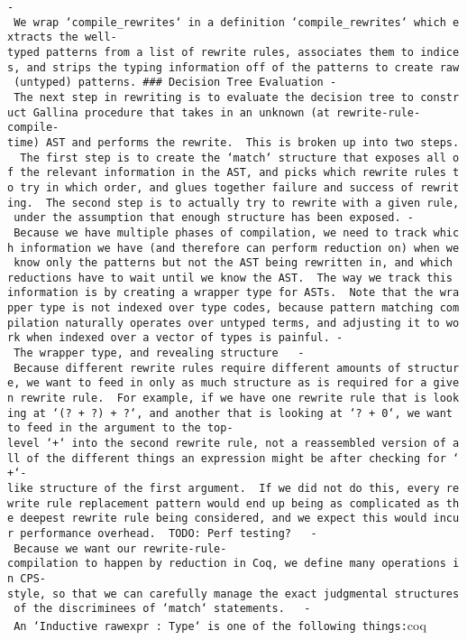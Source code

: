 \texttt{-\ We\ wrap\ `compile\_rewrites\textquotesingle{}`\ in\ a\ definition\ `compile\_rewrites`\ which\ extracts\ the\ well-typed\ patterns\ from\ a\ list\ of\ rewrite\ rules,\ associates\ them\ to\ indices,\ and\ strips\ the\ typing\ information\ off\ of\ the\ patterns\ to\ create\ raw\ (untyped)\ patterns.\ \#\#\#\ Decision\ Tree\ Evaluation\ -\ The\ next\ step\ in\ rewriting\ is\ to\ evaluate\ the\ decision\ tree\ to\ construct\ Gallina\ procedure\ that\ takes\ in\ an\ unknown\ (at\ rewrite-rule-compile-time)\ AST\ and\ performs\ the\ rewrite.\ \ This\ is\ broken\ up\ into\ two\ steps.\ \ The\ first\ step\ is\ to\ create\ the\ `match`\ structure\ that\ exposes\ all\ of\ the\ relevant\ information\ in\ the\ AST,\ and\ picks\ which\ rewrite\ rules\ to\ try\ in\ which\ order,\ and\ glues\ together\ failure\ and\ success\ of\ rewriting.\ \ The\ second\ step\ is\ to\ actually\ try\ to\ rewrite\ with\ a\ given\ rule,\ under\ the\ assumption\ that\ enough\ structure\ has\ been\ exposed.\ -\ Because\ we\ have\ multiple\ phases\ of\ compilation,\ we\ need\ to\ track\ which\ information\ we\ have\ (and\ therefore\ can\ perform\ reduction\ on)\ when\ we\ know\ only\ the\ patterns\ but\ not\ the\ AST\ being\ rewritten\ in,\ and\ which\ reductions\ have\ to\ wait\ until\ we\ know\ the\ AST.\ \ The\ way\ we\ track\ this\ information\ is\ by\ creating\ a\ wrapper\ type\ for\ ASTs.\ \ Note\ that\ the\ wrapper\ type\ is\ not\ indexed\ over\ type\ codes,\ because\ pattern\ matching\ compilation\ naturally\ operates\ over\ untyped\ terms,\ and\ adjusting\ it\ to\ work\ when\ indexed\ over\ a\ vector\ of\ types\ is\ painful.\ -\ The\ wrapper\ type,\ and\ revealing\ structure\ \ \ -\ Because\ different\ rewrite\ rules\ require\ different\ amounts\ of\ structure,\ we\ want\ to\ feed\ in\ only\ as\ much\ structure\ as\ is\ required\ for\ a\ given\ rewrite\ rule.\ \ For\ example,\ if\ we\ have\ one\ rewrite\ rule\ that\ is\ looking\ at\ `(?\ +\ ?)\ +\ ?`,\ and\ another\ that\ is\ looking\ at\ `?\ +\ 0`,\ we\ want\ to\ feed\ in\ the\ argument\ to\ the\ top-level\ `+`\ into\ the\ second\ rewrite\ rule,\ not\ a\ reassembled\ version\ of\ all\ of\ the\ different\ things\ an\ expression\ might\ be\ after\ checking\ for\ `+`-like\ structure\ of\ the\ first\ argument.\ \ If\ we\ did\ not\ do\ this,\ every\ rewrite\ rule\ replacement\ pattern\ would\ end\ up\ being\ as\ complicated\ as\ the\ deepest\ rewrite\ rule\ being\ considered,\ and\ we\ expect\ this\ would\ incur\ performance\ overhead.\ \ TODO:\ Perf\ testing?\ \ \ -\ Because\ we\ want\ our\ rewrite-rule-compilation\ to\ happen\ by\ reduction\ in\ Coq,\ we\ define\ many\ operations\ in\ CPS-style,\ so\ that\ we\ can\ carefully\ manage\ the\ exact\ judgmental\ structures\ of\ the\ discriminees\ of\ `match`\ statements.\ \ \ -\ An\ `Inductive\ rawexpr\ :\ Type`\ is\ one\ of\ the\ following\ things:}coq
